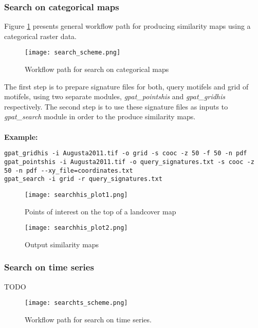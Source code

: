 \subsubsection{Search on categorical maps}
Figure \ref{FIG:SEARCH} presents general workflow path for producing similarity maps using a categorical raster data. 

\begin{figure}[H]
	\centering
	\texttt{[image: search\_scheme.png]}
	\caption{Workflow path for search on categorical maps}
	\label{FIG:SEARCH}
\end{figure}

The first step is to prepare signature files for both, query motifels and grid of motifels, using two separate modules, {\it gpat\_pointshis} and {\it gpat\_gridhis} respectively. 
The second step is to use these signature files as inputs to {\it gpat\_search} module in order to the produce similarity maps.\\\\
{\bf Example:}

\begin{minipage}{\linewidth}
\begin{lstlisting}
gpat_gridhis -i Augusta2011.tif -o grid -s cooc -z 50 -f 50 -n pdf
gpat_pointshis -i Augusta2011.tif -o query_signatures.txt -s cooc -z 50 -n pdf --xy_file=coordinates.txt
gpat_search -i grid -r query_signatures.txt
\end{lstlisting}
\end{minipage}

\begin{figure}[H]
	\centering
	\texttt{[image: searchhis\_plot1.png]}
	\caption{Points of interest on the top of a landcover map}
	\label{FIG:SEARCH1}
\end{figure}

\begin{figure}[H]
	\centering
	\texttt{[image: searchhis\_plot2.png]}
	\caption{Output similarity maps}
	\label{FIG:SEARCH2}
\end{figure}

\FloatBarrier

\subsubsection{Search on time series}
TODO
\begin{figure}[H]
	\centering
	\texttt{[image: searchts\_scheme.png]}
	\caption{Workflow path for search on time series.}
	\label{FIG:SEARCHTS}
\end{figure}

